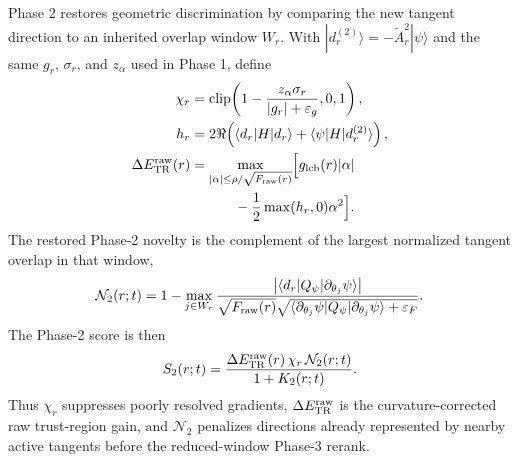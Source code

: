 \documentclass[
  reprint,
  amsmath,
  amssymb,
  aps,
  pra,
  nofootinbib,
  superscriptaddress,
  floatfix
]{revtex4-2}
\newcommand{\TR}{\mathrm{TR}}
\newcommand{\eps}{\varepsilon}
\begin{document}
Phase 2 restores geometric discrimination by comparing the new tangent direction to an inherited overlap window $W_r$. With $|d_r^{(2)}\rangle=-\widetilde A_r^2|\psi\rangle$ and the same $g_r$, $\sigma_r$, and $z_\alpha$ used in Phase 1, define
\begin{align*}
\chi_r&=\operatorname{clip}\!\left(1-\frac{z_{\alpha}\sigma_r}{|g_r|+\eps_g},0,1\right),
\\
h_r&=2\Re\!\left(\langle d_r|H|d_r\rangle+\langle\psi|H|d_r^{(2)}\rangle\right),
\\
\Delta E^{\rm raw}_{\TR}(r)
&=\max_{|\alpha|\le \rho/\sqrt{F_{\rm raw}(r)}}
\Bigl[g_{\rm lcb}(r)|\alpha|\\
&\hspace{1.1cm}
-\frac12\max(h_r,0)\alpha^2\Bigr].
\end{align*}
The restored Phase-2 novelty is the complement of the largest normalized tangent overlap in that window,
\begin{equation*}
\mathcal N_2(r;t)=1-\max_{j\in W_r}
\frac{\left|\langle d_r|Q_\psi|\partial_{\theta_j}\psi\rangle\right|}
{\sqrt{F_{\rm raw}(r)}
\sqrt{\langle\partial_{\theta_j}\psi|Q_\psi|\partial_{\theta_j}\psi\rangle+\eps_F}} .
\end{equation*}
The Phase-2 score is then
\begin{equation}
S_2(r;t)=\frac{\Delta E^{\rm raw}_{\TR}(r)\,\chi_r\,\mathcal N_2(r;t)}{1+K_2(r;t)}.
\label{eq:phase2_score}
\end{equation}
Thus $\chi_r$ suppresses poorly resolved gradients, $\Delta E^{\rm raw}_{\TR}$ is the curvature-corrected raw trust-region gain, and $\mathcal N_2$ penalizes directions already represented by nearby active tangents before the reduced-window Phase-3 rerank.
\end{document}
